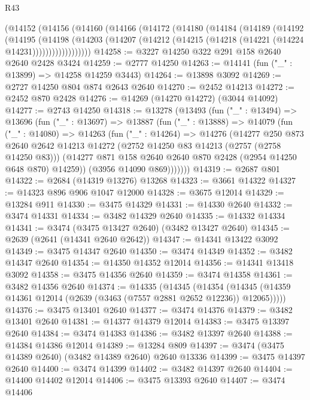 \begin{lexlean}{R43}
\begin{coremodule}
    (@14152
      (@14156
        (@14160
          (@14166
            (@14172
              (@14180
                (@14184
                  (@14189
                    (@14192
                      (@14195
                        (@14198
                          (@14203
                            (@14207 (@14212 (@14215 (@14218 (@14221 (@14224 @14231))))))))))))))))))
@14258 := @3227 @14250 @322 @291 @158 @2640 @2640 @2428 @3424
@14259 := @2777 @14250
@14263 := @14141 (fun ("_" : @13899) => @14258 @14259 @3443)
@14264 := @13898 @3092
@14269 := @2727 @14250 @804 @874 @2643 @2640
@14270 := @2452 @14213
@14272 := @2452 @870 @2428
@14276 := @14269 (@14270 @14272) (@3044 @14092)
@14277 := @2743 @14250
@14318 := @13278
    (@13493
      (fun ("_" : @13494) =>
      @13696
        (fun ("_" : @13697) =>
        @13887
          (fun ("_" : @13888) =>
          @14079
            (fun ("_" : @14080) =>
            @14263
              (fun ("_" : @14264) =>
              @14276
                (@14277
                  @250
                  @873
                  @2640
                  @2642
                  @14213
                  @14272
                  (@2752 @14250 @83 @14213 (@2757 (@2758 @14250 @83)))
                  (@14277 @871 @158 @2640 @2640 @870 @2428 (@2954 @14250 @648 @870) @14259))
                (@3956 @14090 @869)))))))
@14319 := @2687 @801
@14322 := @2684 (@14319 @13276) @13268
@14323 := @3661 @14322
@14327 := @14323 @896 @906 @1047 @12000
@14328 := @3675 @12014
@14329 := @13284 @911
@14330 := @3475 @14329
@14331 := @14330 @2640
@14332 := @3474 @14331
@14334 := @3482 @14329 @2640
@14335 := @14332 @14334
@14341 := @3474 (@3475 @13427 @2640) (@3482 @13427 @2640)
@14345 := @2639 (@2641 (@14341 @2640 @2642))
@14347 := @14341 @13422 @3092
@14349 := @3475 @14347 @2640
@14350 := @3474 @14349
@14352 := @3482 @14347 @2640
@14354 := @14350 @14352 @12014
@14356 := @14341 @13418 @3092
@14358 := @3475 @14356 @2640
@14359 := @3474 @14358
@14361 := @3482 @14356 @2640
@14374 := @14335
    (@14345
      (@14354 (@14345 (@14359 @14361 @12014 (@2639 (@3463 (@7557 @2881 @2652 @12236)) @12065)))))
@14376 := @3475 @13401 @2640
@14377 := @3474 @14376
@14379 := @3482 @13401 @2640
@14381 := @14377 @14379 @12014
@14383 := @3475 @13397 @2640
@14384 := @3474 @14383
@14386 := @3482 @13397 @2640
@14388 := @14384 @14386 @12014
@14389 := @13284 @809
@14397 := @3474 (@3475 @14389 @2640) (@3482 @14389 @2640) @2640 @13336
@14399 := @3475 @14397 @2640
@14400 := @3474 @14399
@14402 := @3482 @14397 @2640
@14404 := @14400 @14402 @12014
@14406 := @3475 @13393 @2640
@14407 := @3474 @14406

\end{coremodule}
\end{lexlean}
